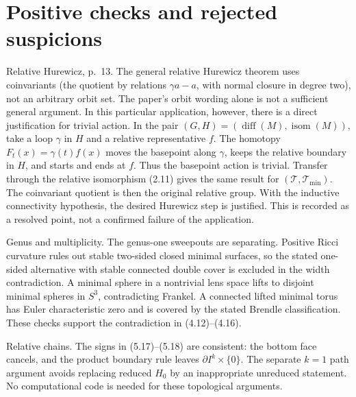 \documentclass[10pt]{article}
\begin{document}
\section*{Positive checks and rejected suspicions}
Relative Hurewicz, p. 13. The general relative Hurewicz theorem uses coinvariants (the quotient by relations \(\gamma a-a\), with normal closure in degree two), not an arbitrary orbit set. The paper’s orbit wording alone is not a sufficient general argument. In this particular application, however, there is a direct justification for trivial action. In the pair \((G,H)=(\operatorname{diff}(M),\operatorname{isom}(M))\), take a loop \(\gamma\) in \(H\) and a relative representative \(f\). The homotopy \(F_t(x)=\gamma(t)f(x)\) moves the basepoint along \(\gamma\), keeps the relative boundary in \(H\), and starts and ends at \(f\). Thus the basepoint action is trivial. Transfer through the relative isomorphism (2.11) gives the same result for \((\mathcal T,\mathcal T_{\min})\). The coinvariant quotient is then the original relative group. With the inductive connectivity hypothesis, the desired Hurewicz step is justified. This is recorded as a resolved point, not a confirmed failure of the application.\par
Genus and multiplicity. The genus-one sweepouts are separating. Positive Ricci curvature rules out stable two-sided closed minimal surfaces, so the stated one-sided alternative with stable connected double cover is excluded in the width contradiction. A minimal sphere in a nontrivial lens space lifts to disjoint minimal spheres in \(S^3\), contradicting Frankel. A connected lifted minimal torus has Euler characteristic zero and is covered by the stated Brendle classification. These checks support the contradiction in (4.12)–(4.16).\par
Relative chains. The signs in (5.17)–(5.18) are consistent: the bottom face cancels, and the product boundary rule leaves \(\partial I^k\times\{0\}\). The separate \(k=1\) path argument avoids replacing reduced \(H_0\) by an inappropriate unreduced statement. No computational code is needed for these topological arguments.\par
\end{document}
